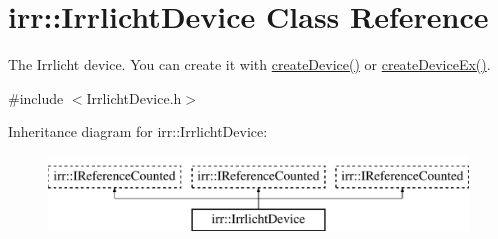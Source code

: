 \hypertarget{classirr_1_1IrrlichtDevice}{}\section{irr\+:\+:Irrlicht\+Device Class Reference}
\label{classirr_1_1IrrlichtDevice}


The Irrlicht device. You can create it with \hyperlink{namespaceirr_a57653fdaf6b2746b141ba2bb07d8bba6}{create\+Device()} or \hyperlink{namespaceirr_ae0a823eb5404bbf156965e7051798496}{create\+Device\+Ex()}.  




{\ttfamily \#include $<$Irrlicht\+Device.\+h$>$}

Inheritance diagram for irr\+:\+:Irrlicht\+Device\+:\begin{figure}[H]
\begin{center}
\leavevmode
\includegraphics[height=2.000000cm]{classirr_1_1IrrlichtDevice}
\end{center}
\end{figure}
